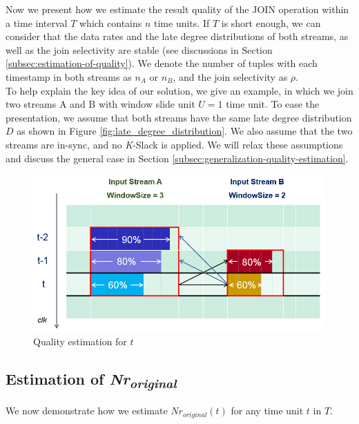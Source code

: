 \documentclass[a4paper, 11pt, twoside]{report}
\begin{document}
Now we present how we estimate the result quality of the JOIN operation within a time interval $T$ which contains $n$ time units. If $T$ is short enough, we can consider that the data rates and the late degree distributions of both streams, as well as the join selectivity are stable (see discussions in Section \ref{subsec:estimation-of-quality}). We denote the number of tuples with each timestamp in both streams as $n_{A}$ or $n_{B}$, and the join selectivity as $\rho$.\\

To help explain the key idea of our solution, we give an example, in which we join two streams A and B with window slide unit $U=1$ time unit. To ease the presentation, we assume that both streams have the same late degree distribution $D$ as shown in Figure \ref{fig:late_degree_distribution}. We also assume that the two streams are in-sync, and no \textit{K}-Slack is applied. We will relax these assumptions and discuss the general case in Section \ref{subsec:generalization-quality-estimation}.\\

\begin{figure}[h]
\centering
\includegraphics[scale=0.6]{quality-estimation}
\caption{Quality estimation for $t$\label{fig:quality-estimation}}
\end{figure}

\subsection{Estimation of \textit{Nr\textsubscript{original}}}

We now demonstrate how we estimate $Nr_{original}(t)$ for any time unit $t$ in $T$.\\

%
\end{document}
